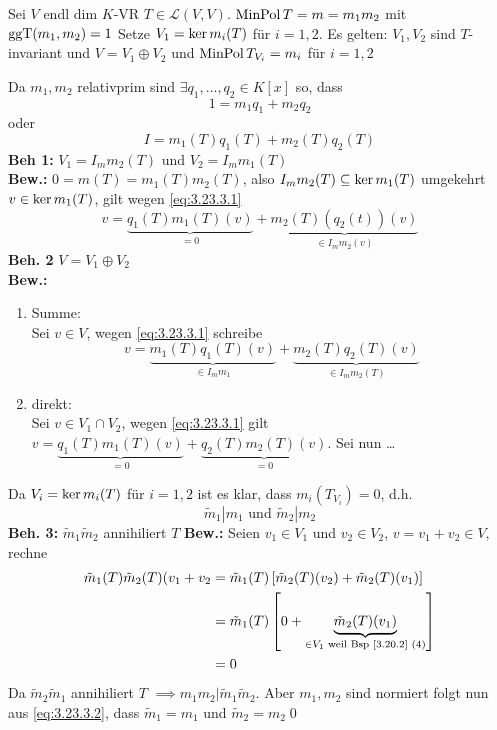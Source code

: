 \begin{subproposition}
	Sei $ V $ endl dim $ K $-VR $ T \in \mathcal{L} (V, V) $.
	$ \operatorname{Min Pol} T = m = m_1 m_2 $ mit $ \operatorname{ggT}(m_1, m_2) = 1 $
	Setze $ V_1 = \operatorname{ker} m_i (T) $ für $ i = 1, 2 $.
	Es gelten: $ V_1, V_2 $ sind $ T $-invariant und $ V = V_1 \oplus V_2 $ und $ \operatorname{Min Pol} T_{V_i} = m_i $ für $ i = 1, 2 $
\end{subproposition}
\begin{subproof*}
	Da $ m_1, m_2 $ relativprim sind $ \exists q_1, \dotsc, q_2 \in K[x] $ so, dass 
	\[
		1 = m_1 q_1 + m_2 q_2
	\]
	oder
	\begin{equation}
		\label{eq:3.23.3.1}
		\tag{$ * $}
		I = m_1(T) q_1(T) + m_2(T) q_2(T)
	\end{equation}
	\textbf{Beh 1:} $ V_1 = I_m  m_2(T) $ und $ V_2 = I_m m_1(T) $\\
	\textbf{Bew.:} $ 0 = m(T) = m_1(T) m_2(T) $, also $ I_m m_2(T) \subseteq \operatorname{ker} m_1(T) $ 
	umgekehrt $ v \in \operatorname{ker} m_1(T) $, gilt wegen \eqref{eq:3.23.3.1}
	\[
		v = \underbrace{q_1(T) m_1(T)(v)}_{= 0} + \underbrace{m_2(T) \left( q_2(t) \right) (v)}_{\in I_m m_2(v)}
	\]
	\textbf{Beh. 2} $ V = V_1 \oplus V_2 $\\
	\textbf{Bew.:}
	\begin{enumerate}[label=(\arabic*)]
		\item Summe:\\
			Sei $ v \in V $, wegen \eqref{eq:3.23.3.1} schreibe
			\[
				v = \underbrace{m_1(T) q_1(T)(v)}_{\in I_m m_1} + \underbrace{m_2(T)q_2(T)(v)}_{\in I_m m_2(T)} 
			\]
		\item direkt:\\
			Sei $ v \in V_1 \cap V_2 $, wegen \eqref{eq:3.23.3.1} gilt $ v = \underbrace{q_1(T) m_1(T)(v)}_{ = 0}  + \underbrace{q_2(T) m_2(T)(v)}_{= 0}  $.
			Sei nun \ldots
	\end{enumerate}
	Da $ V_i = \operatorname{ker} m_i(T) $ für $ i = 1, 2 $ ist es klar, dass $ m_i\left( T_{V_i}  \right) = 0 $, d.h.
	\begin{equation}
		\label{eq:3.23.3.2}
		\tag{$ * * $}
		\tilde m_1 | m_1 \text{ und } 
		\tilde m_2 | m_2
	\end{equation}
	\textbf{Beh. 3:} $ \tilde m_1 \tilde m_2 $ annihiliert $ T $
	\textbf{Bew.:} Seien $ v_1 \in V_1 $ und $ v_2 \in V_2 $, $ v = v_1 + v_2 \in V $, rechne
	\begin{align*}
		\tilde m_1(T) \tilde m_2 (T) (v_1 + v_2 &= 
		\tilde m_1(T) \left[ \tilde m_2 (T) (v_2) + \tilde m_2 (T) (v_1) \right]\\
		~ &= \tilde m_1(T) \left[ 0 + \underbrace{\tilde m_2 (T) (v_1)}_{\in V_1 \text{ weil Bsp \ref{3.20.2} (4)} } \right]\\
		~ &= 0
	\end{align*}
	Da $ \tilde m_2 \tilde m_1 $ annihiliert $ T $ $ \implies m_1m_2 | \tilde m_1 \tilde m_2 $.
	Aber $ m_1, m_2 $ sind normiert folgt nun aus \eqref{eq:3.23.3.2}, dass $ \tilde m_1 = m_1 $ und $ \tilde m_2 = m_2 $\qed
\end{subproof*}

